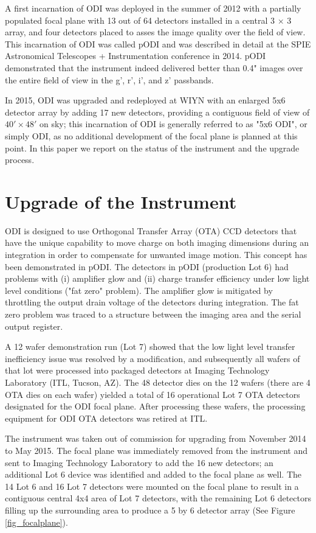 \documentclass[]{spieman}
\begin{document}
A first incarnation of ODI was deployed in the summer of 2012 with a partially
populated focal plane with 13 out of 64 detectors installed in a central 3
$\times$ 3 array, and four detectors placed to asses the image quality over the
field of view. This incarnation of ODI was called pODI and was described in
detail at the SPIE Astronomical Telescopes + Instrumentation conference in
2014\cite{harbeck2014}. pODI demonstrated that the instrument indeed delivered
better than 0.4" images over the entire field of view in the g', r', i', and z'
passbands.

In 2015, ODI was upgraded and redeployed at WIYN  with an enlarged 5x6  detector
array by adding 17 new detectors, providing a contiguous field of view of $40'
\times 48'$ on sky; this incarnation  of ODI is generally  referred to as "5x6
ODI", or simply ODI, as no additional development of the focal plane is planned
at this point. In this paper we report on the status of the instrument and the
upgrade process.


\section{Upgrade of the Instrument} 

ODI is designed to use Orthogonal Transfer Array (OTA) CCD detectors that have
the unique capability to move charge on both imaging dimensions during an
integration in order to compensate for unwanted image motion. This concept has
been demonstrated in pODI.  The detectors in pODI (production Lot 6) had
problems with (i) amplifier glow and (ii)  charge transfer efficiency under low
light level conditions ("fat zero" problem). The amplifier glow is mitigated by
throttling the output drain voltage of the detectors during integration. The fat
zero problem was traced to a structure between the imaging area and the serial
output register.

A  12 wafer demonstration run (Lot 7)  showed that the low light level transfer
inefficiency issue was resolved by a modification\cite{harbeck2014}, and
subsequently all wafers of that lot were processed into packaged detectors at
Imaging Technology Laboratory (ITL, Tucson, AZ). The  48 detector dies on the 12
wafers (there are 4 OTA dies on each wafer) yielded a total of 16 operational
Lot 7 OTA detectors designated for the ODI focal plane. After processing these
wafers, the processing equipment for ODI OTA detectors was retired at ITL.

The instrument was taken out of commission for upgrading from November 2014 to
May 2015. The focal plane was immediately removed from the instrument and sent
to  Imaging Technology Laboratory to add the 16 new detectors; an additional Lot
6 device was identified and added to the focal plane as well. The 14 Lot 6 and
16 Lot 7 detectors were mounted on the focal plane to result in a contiguous
central 4x4 area of Lot 7 detectors, with the remaining Lot 6 detectors filling
up the surrounding area to produce a 5 by 6 detector array (See Figure
\ref{fig_focalplane}).
\end{document}
